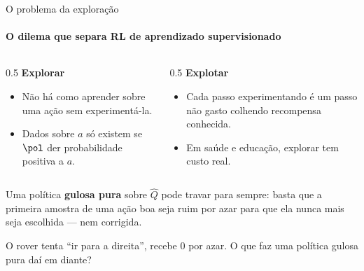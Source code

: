 \documentclass[aspectratio=169, 11pt]{beamer}
\newcommand{\Qhat}{\widehat{Q}}
\begin{document}
\begin{frame}{O problema da exploração}
  \framesubtitle{O dilema que separa RL de aprendizado supervisionado}

  \begin{columns}[T]
    \begin{column}{0.5\textwidth}
      \textbf{Explorar}
      \begin{itemize}\setlength{\itemsep}{0.2ex}
        \item Não há como aprender sobre uma ação sem experimentá-la.
        \item Dados sobre $a$ só existem se $\pol$ der probabilidade
          positiva a $a$.
      \end{itemize}
    \end{column}
    \begin{column}{0.5\textwidth}
      \textbf{Explotar}
      \begin{itemize}\setlength{\itemsep}{0.2ex}
        \item Cada passo experimentando é um passo não gasto colhendo
          recompensa conhecida.
        \item Em saúde e educação, explorar tem custo real.
      \end{itemize}
    \end{column}
  \end{columns}

  \vspace{-0.2em}
  {\small Uma política \textbf{gulosa pura} sobre $\Qhat$ pode travar para
  sempre: basta que a primeira amostra de uma ação boa seja ruim por azar
  para que ela nunca mais seja escolhida --- nem corrigida.}

  \vspace{-0.4em}
  \begin{quizbox}{}
    O rover tenta ``ir para a direita'', recebe $0$ por azar. O que faz
    uma política gulosa pura daí em diante?
  \end{quizbox}
\end{frame}
\end{document}
